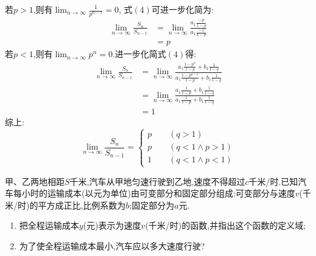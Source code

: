 \begin{questions}
\begin{solution}
		若$p>1$,则有$\displaystyle\lim_{n\to\infty}\frac{1}{p^{n-1}} = 0$, 式$(4)$可进一步化简为:
		\begin{align*}
			\lim_{n\to\infty}\frac{S_n}{S_{n-1}} & = \lim_{n\to\infty}\frac{a_1\frac{-p}{1-p}}{a_1\frac{-1}{1-p}} \\
			                                     & = p
		\end{align*}
		若$p<1$,则有$\displaystyle\lim_{n\to\infty}p^n=0$.进一步化简式$(4)$得:
		\begin{align*}
			\lim_{n\to\infty}\frac{S_n}{S_{n-1}} & =
			\lim_{n\to\infty}\frac{a_1\frac{1-p^n}{1-p} + b_1\frac{1}{1-q}}{a_1\frac{1-p^{n-1}}{1-p} + b_1\frac1{1-q}}
			\\
			                                     & = \lim_{n\to\infty}\frac{a_1\frac{1}{1-p}
			+b_1\frac1{1-q}}{a_1\frac{1}{1-p} + b_1\frac1{1-q}}                              \\
			                                     & = 1
		\end{align*}
		综上:
		\begin{equation*}
			\lim_{n\to\infty}\frac{S_n}{S_{n-1}}  =
			\begin{cases}
				p \qquad (q >1)              \\
				p \qquad (q < 1 \land p > 1) \\
				1 \qquad (q < 1 \land p < 1)
			\end{cases}
		\end{equation*}
	\end{solution}

	\question
	甲、乙两地相距$S$千米,汽车从甲地匀速行驶到乙地,速度不得超过$c$千米/时.已知汽车每小时的运输成本(以元为单位)由可变部分和固定部分组成:可变部分与速度$v$(千米/时)的平方成正比,比例系数为$b$;固定部分为$a$元.
	\begin{enumerate}[label=(\arabic*)]
		\item 把全程运输成本$y$(元)表示为速度$v$(千米/时)的函数,并指出这个函数的定义域;
		\item 为了使全程运输成本最小,汽车应以多大速度行驶?
	\end{enumerate}


\end{questions}
